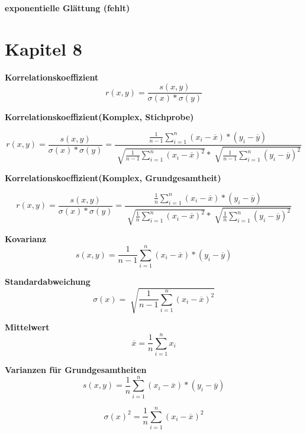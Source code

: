 \documentclass[11pt,twocolumn,fleqn]{article}
\begin{document}
\textbf{exponentielle Glättung (fehlt)}

\section{Kapitel 8}
\textbf{Korrelationskoeffizient}
\begin{equation*}
r(x,y)= \frac{s(x,y)}{\sigma(x)*\sigma(y)}
\end{equation*}

\textbf{Korrelationskoeffizient(Komplex, Stichprobe)}

  \begin{equation*}
  r(x,y)= \frac{s(x,y)}{\sigma(x)*\sigma(y)} = \frac{ \frac{1}{n-1}\sum^n_{i=1}(x_i-\overline{x})*(y_i-\overline{y}) }{ \sqrt[]{ \frac{1}{n-1}\sum^n_{i=1}(x_i - \overline{x})^2 } * \sqrt[]{ \frac{1}{n-1}\sum^n_{i=1}(y_i - \overline{y})^2 } }
  \end{equation*}
  
\textbf{Korrelationskoeffizient(Komplex, Grundgesamtheit)}

  \begin{equation*}
  r(x,y)= \frac{s(x,y)}{\sigma(x)*\sigma(y)} = \frac{ \frac{1}{n}\sum^n_{i=1}(x_i-\overline{x})*(y_i-\overline{y}) }{ \sqrt[]{ \frac{1}{n}\sum^n_{i=1}(x_i - \overline{x})^2 } * \sqrt[]{ \frac{1}{n}\sum^n_{i=1}(y_i - \overline{y})^2 } }
  \end{equation*}  


\textbf{Kovarianz}
\begin{equation*}
s(x,y)=\frac{1}{n-1}\sum^n_{i=1}(x_i-\overline{x})*(y_i-\overline{y}) 
\end{equation*}

\textbf{Standardabweichung}
\begin{equation*}
\sigma(x) = \sqrt[]{ \frac{1}{n-1}\sum^n_{i=1}(x_i-\overline{x})^2 }
\end{equation*}

\textbf{Mittelwert}
\begin{equation*}
\overline{x}=\frac{1}{n}\sum^n_{i=1}x_i
\end{equation*}

\textbf{Varianzen für Grundgesamtheiten}
\begin{equation*}
s(x,y)=\frac{1}{n}\sum^n_{i=1}(x_i-\overline{x})*(y_i-\overline{y}) 
\end{equation*}

\begin{equation*}
\sigma(x)^2=\frac{1}{n}\sum^n_{i=1}(x_i-\overline{x})^2 
\end{equation*}
\end{document}
